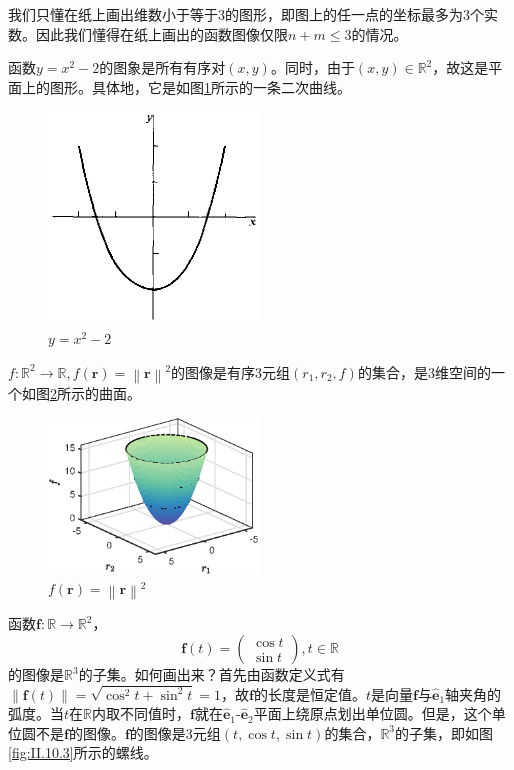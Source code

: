 \documentclass[main.tex]{subfiles}
\begin{document}
我们只懂在纸上画出维数小于等于3的图形，即图上的任一点的坐标最多为3个实数。因此我们懂得在纸上画出的函数图像仅限$n+m\leq3$的情况。
\begin{example}
    函数$y=x^2-2$的图象是所有有序对$\left(x,y\right)$。同时，由于$\left(x,y\right)\in\mathbb{R}^2$，故这是平面上的图形。具体地，它是如图\ref{fig:II.10.1}所示的一条二次曲线。
\end{example}
\begin{figure}[h]
    \centering
    \includegraphics[width=0.5\textwidth]{images/II.10.1.eps}
    \caption{$y=x^2-2$}
    \label{fig:II.10.1}
\end{figure}
\begin{example}\label{exp:II.12.5}
    $f:\mathbb{R}^2\rightarrow\mathbb{R},f\left(\mathbf{r}\right)=\left\|\mathbf{r}\right\|^2$的图像是有序3元组$\left(r_1,r_2,f\right)$的集合，是3维空间的一个如图\ref{fig:II.10.2}所示的曲面。
\end{example}
\begin{figure}[h]
    \centering
    \includegraphics[width=0.5\textwidth]{images/II.10.2.eps}
    \caption{$f\left(\mathbf{r}\right)=\left\|\mathbf{r}\right\|^2$}
    \label{fig:II.10.2}
\end{figure}
\begin{example}\label{exp:II.12.6}
    函数$\mathbf{f}:\mathbb{R}\rightarrow\mathbb{R}^2$，
    \[
        \mathbf{f}\left(t\right)=\left(\begin{array}{c}\cos t\\\sin t\end{array}\right),t\in\mathbb{R}
    \]
    的图像是$\mathbb{R}^3$的子集。如何画出来？首先由函数定义式有$\left\|\mathbf{f}\left(t\right)\right\|=\sqrt{\cos^2t+\sin^2t}=1$，故$\mathbf{f}$的长度是恒定值。$t$是向量$\mathbf{f}$与$\mathbf{\hat{e}}_1$轴夹角的弧度。当$t$在$\mathbb{R}$内取不同值时，$\mathbf{f}$就在$\mathbf{\hat{e}}_1$-$\mathbf{\hat{e}}_2$平面上绕原点划出单位圆。但是，这个单位圆不是$\mathbf{f}$的图像。$\mathbf{f}$的图像是3元组$\left(t,\cos t,\sin t\right)$的集合，$\mathbb{R}^3$的子集，即如图\ref{fig:II.10.3}所示的螺线。
\end{example}
\end{document}
